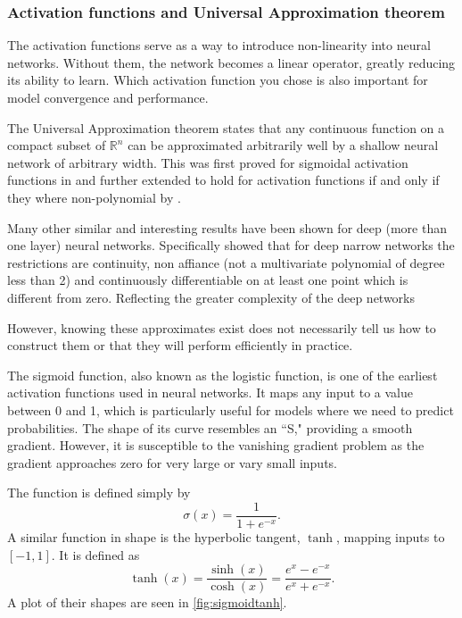 \documentclass{article}
\theoremstyle{definition}
\begin{document}
\subsubsection{Activation functions and Universal Approximation theorem}
The activation functions serve as a way to introduce non-linearity into neural networks. Without them, the network becomes a linear operator, greatly reducing its ability to learn.  Which  activation function you chose is also important for model convergence and performance.

The Universal Approximation theorem states that any continuous function on a compact subset of $\mathbb{R}^{n}$ can be approximated arbitrarily well by a shallow neural network of arbitrary width. This was first proved for sigmoidal activation functions in  \textcite{universalapprox} and further extended to hold for activation functions if and only if they where non-polynomial by \textcite{pinkus_1999}. 

Many other similar and interesting results have been shown for deep (more than one layer) neural networks. Specifically \textcite{kidger2020universal} showed that for  deep narrow networks the restrictions are continuity, non affiance (not a multivariate polynomial of degree less than 2) and continuously differentiable on at least one point which is different from zero. Reflecting the greater complexity of the deep networks

However, knowing these approximates exist does not necessarily tell us how to construct them or that they will perform efficiently in practice.

The sigmoid function, also known as the logistic function, is one of the earliest activation functions used in neural networks. It maps any input to a value between 0 and 1, which is particularly useful for models where we need to predict probabilities. The shape of its curve resembles an ``S," providing a smooth gradient. However, it is susceptible to the vanishing gradient problem as the gradient approaches zero for very large or vary small inputs.

The function is defined simply by
\begin{equation*}
    \sigma(x) = \frac{1}{1 + e^{-x}}.
\end{equation*}
A similar function in shape is the hyperbolic tangent, $\tanh$, mapping inputs to $[-1, 1]$. It is defined as
\begin{equation*}
    \tanh(x) = \frac{\sinh(x)}{\cosh(x)} = \frac{e^x - e^{-x}}{e^x + e^{-x}}.
\end{equation*}
A plot of their shapes are seen in \autoref{fig:sigmoidtanh}.
\end{document}
